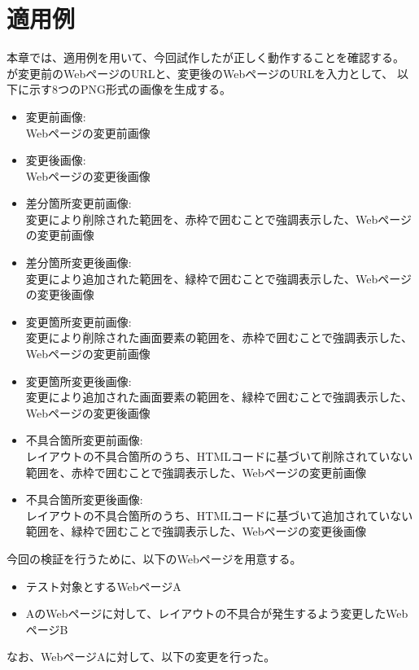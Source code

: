 \chapter{適用例}\label{cha:Indication}
本章では、適用例を用いて、今回試作した\toolName が正しく動作することを確認する。
\toolName が変更前のWebページのURLと、変更後のWebページのURLを入力として、
以下に示す8つのPNG形式の画像を生成する。
\begin{itemize}
    \item 変更前画像:\\
          Webページの変更前画像
    \item 変更後画像:\\
          Webページの変更後画像
    \item 差分箇所変更前画像:\\
          変更により削除された範囲を、赤枠で囲むことで強調表示した、Webページの変更前画像
    \item 差分箇所変更後画像:\\
          変更により追加された範囲を、緑枠で囲むことで強調表示した、Webページの変更後画像
    \item 変更箇所変更前画像:\\
          変更により削除された画面要素の範囲を、赤枠で囲むことで強調表示した、Webページの変更前画像
    \item 変更箇所変更後画像:\\
          変更により追加された画面要素の範囲を、緑枠で囲むことで強調表示した、Webページの変更後画像
    \item 不具合箇所変更前画像:\\
          レイアウトの不具合箇所のうち、HTMLコードに基づいて削除されていない範囲を、赤枠で囲むことで強調表示した、Webページの変更前画像
    \item 不具合箇所変更後画像:\\
          レイアウトの不具合箇所のうち、HTMLコードに基づいて追加されていない範囲を、緑枠で囲むことで強調表示した、Webページの変更後画像
\end{itemize}
今回の検証を行うために、以下のWebページを用意する。
\begin{itemize}
    \setlength{\itemsep}{0pt}
          \setlength{\parsep}{0pt}
    \item テスト対象とするWebページA\label{item: ex1_bf}
    \item AのWebページに対して、レイアウトの不具合が発生するよう変更したWebページB\label{item: ex1_af}
\end{itemize}
なお、WebページAに対して、以下の変更を行った。

